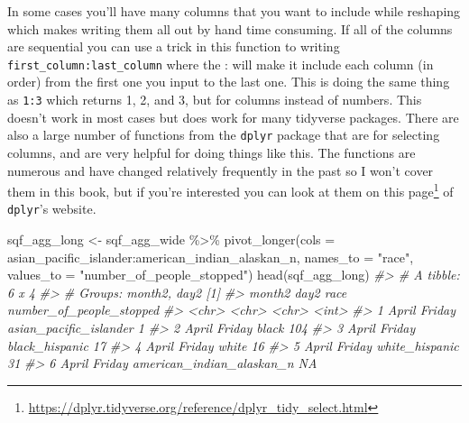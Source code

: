 \documentclass[
]{krantz}
\makeatletter
\newenvironment{Shaded}{\begin{snugshade}}{\end{snugshade}}
\newcommand{\AttributeTok}[1]{\textcolor[rgb]{0.61,0.61,0.61}{#1}}
\newcommand{\CommentTok}[1]{\textcolor[rgb]{0.37,0.37,0.37}{\textit{#1}}}
\newcommand{\FunctionTok}[1]{\textcolor[rgb]{0,0,0}{#1}}
\newcommand{\NormalTok}[1]{#1}
\newcommand{\OtherTok}[1]{\textcolor[rgb]{0.37,0.37,0.37}{#1}}
\newcommand{\SpecialCharTok}[1]{\textcolor[rgb]{0,0,0}{#1}}
\newcommand{\StringTok}[1]{\textcolor[rgb]{0.5,0.5,0.5}{#1}}
\renewcommand{\href}[2]{#2\footnote{\url{#1}}}
\newenvironment{kframe}{%
\medskip{}
\setlength{\fboxsep}{.8em}
 \def\at@end@of@kframe{}%
 \ifinner\ifhmode%
  \def\at@end@of@kframe{\end{minipage}}%
  \begin{minipage}{\columnwidth}%
 \fi\fi%
 \def\FrameCommand##1{\hskip\@totalleftmargin \hskip-\fboxsep
 \colorbox{shadecolor}{##1}\hskip-\fboxsep
     \hskip-\linewidth \hskip-\@totalleftmargin \hskip\columnwidth}%
 \MakeFramed {\advance\hsize-\width
   \@totalleftmargin\z@ \linewidth\hsize
   \@setminipage}}%
 {\par\unskip\endMakeFramed%
 \at@end@of@kframe}
\renewenvironment{Shaded}{\begin{kframe}}{\end{kframe}}
\makeatother
\begin{document}
In some cases you'll have many columns that you want to include while reshaping which makes writing them all out by hand time consuming. If all of the columns are sequential you can use a trick in this function to writing \texttt{first\_column:last\_column} where the : will make it include each column (in order) from the first one you input to the last one. This is doing the same thing as \texttt{1:3} which returns 1, 2, and 3, but for columns instead of numbers. This doesn't work in most cases but does work for many tidyverse packages. There are also a large number of functions from the \texttt{dplyr} package that are for selecting columns, and are very helpful for doing things like this. The functions are numerous and have changed relatively frequently in the past so I won't cover them in this book, but if you're interested you can look at them on \href{https://dplyr.tidyverse.org/reference/dplyr_tidy_select.html}{this page} of \texttt{dplyr}'s website.

\begin{Shaded}
\begin{Highlighting}[]
\NormalTok{sqf\_agg\_long }\OtherTok{\textless{}{-}}\NormalTok{ sqf\_agg\_wide }\SpecialCharTok{\%\textgreater{}\%}
  \FunctionTok{pivot\_longer}\NormalTok{(}\AttributeTok{cols =}\NormalTok{ asian\_pacific\_islander}\SpecialCharTok{:}\NormalTok{american\_indian\_alaskan\_n,}
               \AttributeTok{names\_to =} \StringTok{"race"}\NormalTok{,}
               \AttributeTok{values\_to =} \StringTok{"number\_of\_people\_stopped"}\NormalTok{)}
\FunctionTok{head}\NormalTok{(sqf\_agg\_long)}
\CommentTok{\#\textgreater{} \# A tibble: 6 x 4}
\CommentTok{\#\textgreater{} \# Groups:   month2, day2 [1]}
\CommentTok{\#\textgreater{}   month2 day2   race                      number\_of\_people\_stopped}
\CommentTok{\#\textgreater{}   \textless{}chr\textgreater{}  \textless{}chr\textgreater{}  \textless{}chr\textgreater{}                                        \textless{}int\textgreater{}}
\CommentTok{\#\textgreater{} 1 April  Friday asian\_pacific\_islander                           1}
\CommentTok{\#\textgreater{} 2 April  Friday black                                          104}
\CommentTok{\#\textgreater{} 3 April  Friday black\_hispanic                                  17}
\CommentTok{\#\textgreater{} 4 April  Friday white                                           16}
\CommentTok{\#\textgreater{} 5 April  Friday white\_hispanic                                  31}
\CommentTok{\#\textgreater{} 6 April  Friday american\_indian\_alaskan\_n                       NA}
\end{Highlighting}
\end{Shaded}
\end{document}
